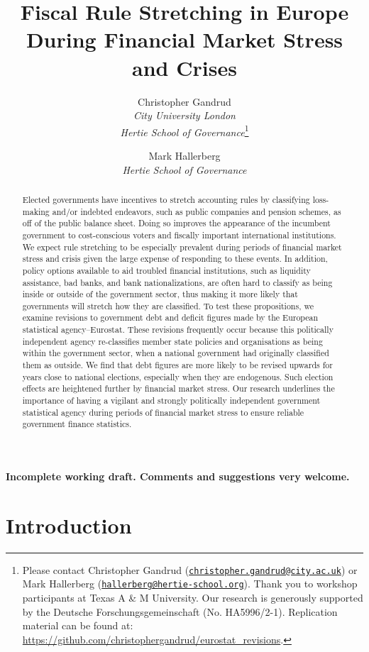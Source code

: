 \documentclass[]{article}
\title{Fiscal Rule Stretching in Europe During Financial Market Stress and Crises}
\author{Christopher Gandrud \\ \emph{City University London} \\ \emph{Hertie School of Governance}\footnote{Please contact Christopher Gandrud
(\href{mailto:christopher.gandrud@city.ac.uk}{\nolinkurl{christopher.gandrud@city.ac.uk}}) or Mark Hallerberg (\href{mailto:hallerberg@hertie-school.org}{\nolinkurl{hallerberg@hertie-school.org}}). Thank you to workshop participants at Texas A \& M University. Our research is generously supported by the Deutsche Forschungsgemeinschaft (No. HA5996/2-1). Replication material can be found at: \url{https://github.com/christophergandrud/eurostat_revisions}.}
\and
Mark Hallerberg \\ \emph{Hertie School of Governance}}
\begin{document}
\maketitle


\begin{center}
    \textbf{Incomplete working draft. Comments and suggestions very welcome.}
\end{center}

\begin{abstract}
    Elected governments have incentives to stretch accounting rules by classifying loss-making and/or indebted endeavors, such as public companies and pension schemes, as off of the public balance sheet. Doing so improves the appearance of the incumbent government to cost-conscious voters and fiscally important international institutions. We expect rule stretching to be especially prevalent during periods of financial market stress and crisis given the large expense of responding to these events. In addition, policy options available to aid troubled financial institutions, such as liquidity assistance, bad banks, and bank nationalizations, are often hard to classify as being inside or outside of the government sector, thus making it more likely that governments will stretch how they are classified. To test these propositions, we examine revisions to government debt and deficit figures made by the European statistical agency--Eurostat. These revisions frequently occur because this politically independent agency re-classifies member state policies and organisations as being within the government sector, when a national government had originally classified them as outside. We find that debt figures are more likely to be revised upwards for years close to national elections, especially when they are endogenous. Such election effects are heightened further by financial market stress. Our research underlines the importance of having a vigilant and strongly politically independent government statistical agency during periods of financial market stress to ensure reliable government finance statistics.
\end{abstract}

\section{Introduction}
\end{document}
